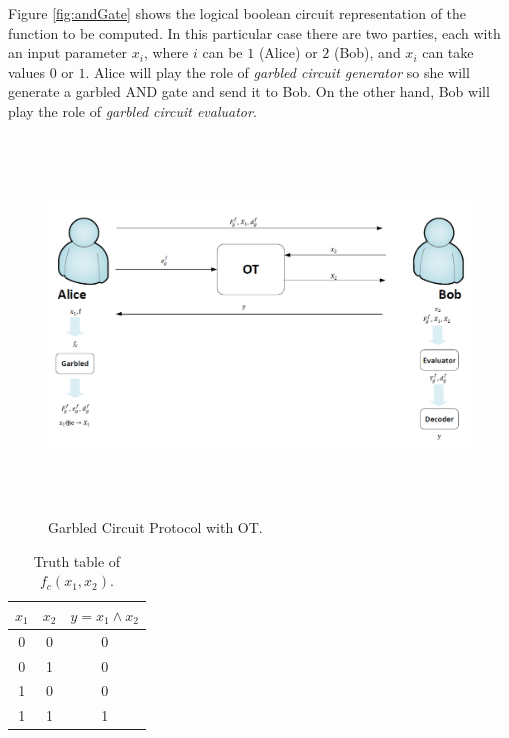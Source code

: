 \begin{refsection}
Figure \ref{fig:andGate} shows the logical boolean circuit representation of the function to be computed. In this particular case there are two parties, each with an input parameter $x_i$, where $i$ can be $1$ (Alice) or $2$ (Bob), and $x_i$ can take values $0$ or $1$. Alice will play the role of \textit{garbled circuit generator} so she will generate a garbled AND gate and send it to Bob. On the other hand, Bob will play the role of \textit{garbled circuit evaluator}.

\begin{figure}[H]
	\centering
	\includegraphics[width=1\textwidth, height=10cm]{./sdf/secure_multiparty_computation/figures/smc_with_ot.png}
    \caption{Garbled Circuit Protocol with OT.}\label{fig:smcwithot}
\end{figure}



\begin{table}[H]
\centering
\begin{tabular}{|c|c|c|}
\hline
$x_1$           & $x_2$             & $y=x_1 \wedge x_2$       \\ \hline
0               & 0                 & 0                             \\ \hline
0               & 1                 & 0                             \\ \hline
1               & 0                 & 0                             \\ \hline
1               & 1                 & 1                             \\ \hline
\end{tabular}
\caption{Truth table of $f_c(x_1,x_2)$.}\label{tb:truthtable}
\end{table}


\end{refsection}
